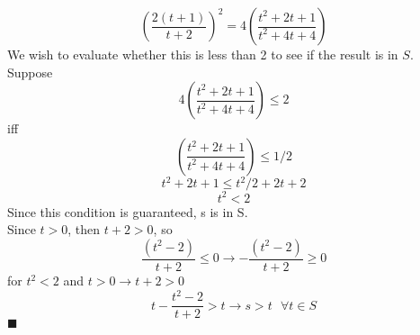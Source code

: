 \documentclass[12pt]{article}
\begin{document}
\begin{enumerate}
$$ \left(\frac{2(t+1)}{t+2}\right)^2 = 4\left(\frac{t^2 + 2t + 1}{t^2 + 4t + 4}\right)$$
We wish to evaluate whether this is less than 2 to see if the result is in $S$.
Suppose 
$$ 4\left(\frac{t^2 + 2t + 1}{t^2 + 4t + 4}\right) \leq 2$$
iff
$$ \left(\frac{t^2 + 2t + 1}{t^2 + 4t + 4}\right) \leq 1/2$$
$$ t^2 + 2t + 1 \leq t^2/2 + 2t + 2$$
$$ t^2 < 2$$
Since this condition is guaranteed, s is in S.\\
Since $ t > 0 $, then $ t + 2 > 0$, so \\
$$ \frac{(t^2-2)}{t+2} \leq 0 \rightarrow -\frac{(t^2-2)}{t+2} \geq 0$$
for $t^2 < 2$ and $t > 0 \rightarrow t + 2 > 0$
$$ t - \frac{t^2-2}{t+2} > t \rightarrow s > t \text{ } \forall t \in S$$
$\blacksquare$\\
\end{enumerate}
\end{document}
